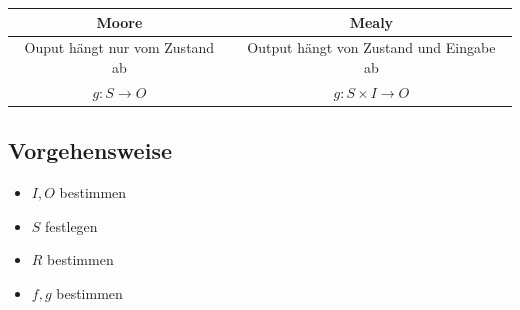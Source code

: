 \documentclass[6pt,a4paper]{scrartcl}
\newcommand{\ra}[0]{\ensuremath{\rightarrow}} 									%
\begin{document}
\begin{multicols}{3}
\begin{tabular}{c | c}
 Moore & Mealy \\ \midrule
 Ouput hängt nur vom Zustand ab & Output hängt von Zustand und Eingabe ab\\
 $g: S \ra O$ & $g: S \times I \ra O$
\end{tabular}

\subsection{Vorgehensweise} %
\begin{itemize}
	\item $I, O$ bestimmen
	\item $S$ festlegen 
	\item $R$ bestimmen
	\item $f,g$ bestimmen
\end{itemize}

\end{multicols}
\end{document}
